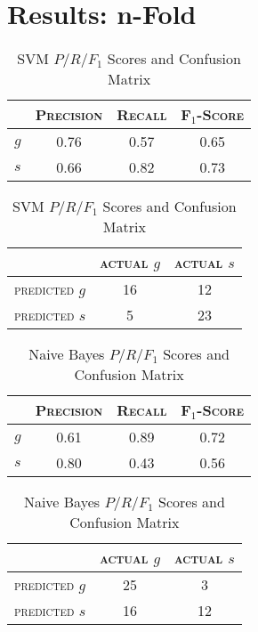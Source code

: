 \section{Results: n-Fold}
\begin{table}[ht]
\begin{minipage}[b]{0.45\linewidth}\centering
\begin{tabular}{ c | c  c  c }
	& \textsc{Precision} & \textsc{Recall} & \textsc{F$_1$-Score} \\
	\hline
	\textsc{$g$} 	& 0.76 & 0.57 & 0.65 \\
	\textsc{$s$}	& 0.66 & 0.82 & 0.73
\end{tabular}
\end{minipage}
\hspace{0.5cm}
\begin{minipage}[b]{0.45\linewidth}
\centering
\begin{tabular}{ c | c  c }
	 & \textsc{actual $g$} & \textsc{actual $s$} \\
	\hline
	\textsc{predicted $g$} 	& 16 & 12 \\
	\textsc{predicted $s$}		& 5 & 23
\end{tabular}
\end{minipage}
\caption{SVM $P/R/F_1$ Scores and Confusion Matrix}
\end{table}

\begin{table}[ht]
\begin{minipage}[b]{0.45\linewidth}\centering
\begin{tabular}{ c | c  c  c }
	& \textsc{Precision} & \textsc{Recall} & \textsc{F$_1$-Score} \\
	\hline
	\textsc{$g$} 	& 0.61 & 0.89 & 0.72 \\
	\textsc{$s$}	& 0.80 & 0.43 & 0.56
\end{tabular}
\end{minipage}
\hspace{0.5cm}
\begin{minipage}[b]{0.45\linewidth}
\centering
\begin{tabular}{ c | c  c }
	 & \textsc{actual $g$} & \textsc{actual $s$} \\
	\hline
	\textsc{predicted $g$} 	& 25 & 3 \\
	\textsc{predicted $s$}		& 16 & 12
\end{tabular}
\end{minipage}
\caption{Naive Bayes $P/R/F_1$ Scores and Confusion Matrix}
\end{table}

